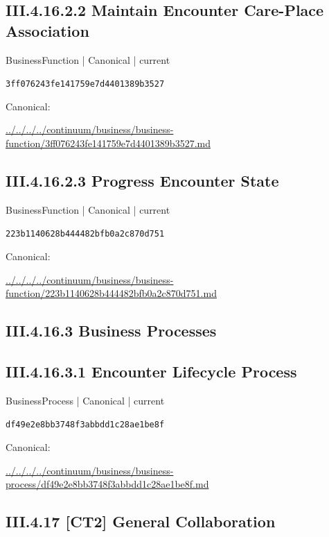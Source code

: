 \documentclass[10pt,a4paper]{article}
\begin{document}
\subsection*{III.4.16.2.2 Maintain Encounter Care-Place Association}
{\small BusinessFunction | Canonical | current}\par
\texttt{3ff076243fe141759e7d4401389b3527}\par
Canonical: \par
{\footnotesize\url{../../../../continuum/business/business-function/3ff076243fe141759e7d4401389b3527.md}}\par
\subsection*{III.4.16.2.3 Progress Encounter State}
{\small BusinessFunction | Canonical | current}\par
\texttt{223b1140628b444482bfb0a2c870d751}\par
Canonical: \par
{\footnotesize\url{../../../../continuum/business/business-function/223b1140628b444482bfb0a2c870d751.md}}\par
\subsection*{III.4.16.3 Business Processes}
\subsection*{III.4.16.3.1 Encounter Lifecycle Process}
{\small BusinessProcess | Canonical | current}\par
\texttt{df49e2e8bb3748f3abbdd1c28ae1be8f}\par
Canonical: \par
{\footnotesize\url{../../../../continuum/business/business-process/df49e2e8bb3748f3abbdd1c28ae1be8f.md}}\par
\subsection*{III.4.17 [CT2] General Collaboration}
\end{document}
